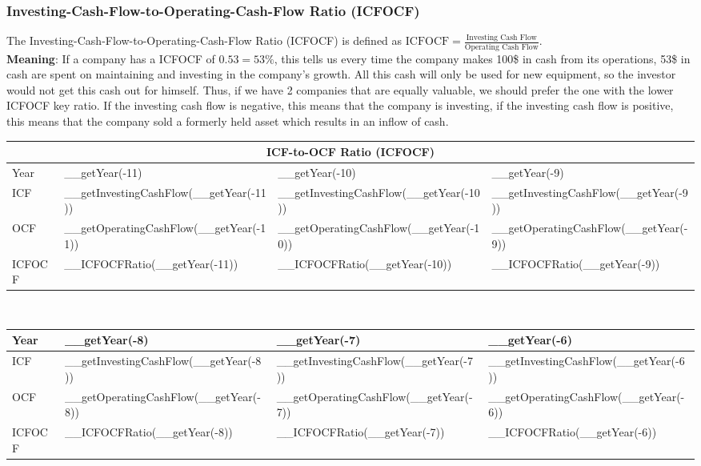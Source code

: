\subsubsection{Investing-Cash-Flow-to-Operating-Cash-Flow Ratio (ICFOCF)}

The Investing-Cash-Flow-to-Operating-Cash-Flow Ratio (ICFOCF) is defined as
$\text{ICFOCF} = \frac{\text{Investing Cash Flow}}{\text{Operating Cash Flow}}$.\\
\textbf{Meaning}: If a company has a ICFOCF of $0.53 = 53\%$, this tells us every
time the company makes 100\$ in cash from its operations, 53\$ in cash are spent
on maintaining and investing in the company's growth. All this cash will only be
used for new equipment, so the investor would not get this cash out for himself.
Thus, if we have 2 companies that are equally valuable, we should prefer the one
with the lower ICFOCF key ratio. If the investing cash flow is negative, this means
that the company is investing, if the investing cash flow is positive, this means
that the company sold a formerly held asset which results in an inflow of cash.\\

\begin{tabularx}{\textwidth}{|X|X|X|X|}
 \hline
 \multicolumn{4}{|c|}{ICF-to-OCF Ratio (ICFOCF)} \\
 \hline
 Year                        & __getYear(-11)                          & __getYear(-10)                          & __getYear(-9)                         \\
 \hline
 ICF                         & __getInvestingCashFlow(__getYear(-11))  & __getInvestingCashFlow(__getYear(-10))  & __getInvestingCashFlow(__getYear(-9)) \\
 OCF                         & __getOperatingCashFlow(__getYear(-11))  & __getOperatingCashFlow(__getYear(-10))  & __getOperatingCashFlow(__getYear(-9)) \\
 \rowcolor{lightgray} ICFOCF & __ICFOCFRatio(__getYear(-11))           & __ICFOCFRatio(__getYear(-10))           & __ICFOCFRatio(__getYear(-9))          \\
 \hline
\end{tabularx}\\

\begin{tabularx}{\textwidth}{|X|X|X|X|}
 \hline
 Year                        & __getYear(-8)                          & __getYear(-7)                          & __getYear(-6)                         \\
 \hline
 ICF                         & __getInvestingCashFlow(__getYear(-8))  & __getInvestingCashFlow(__getYear(-7))  & __getInvestingCashFlow(__getYear(-6)) \\
 OCF                         & __getOperatingCashFlow(__getYear(-8))  & __getOperatingCashFlow(__getYear(-7))  & __getOperatingCashFlow(__getYear(-6)) \\
 \rowcolor{lightgray} ICFOCF & __ICFOCFRatio(__getYear(-8))           & __ICFOCFRatio(__getYear(-7))           & __ICFOCFRatio(__getYear(-6))          \\
 \hline
\end{tabularx}\\

